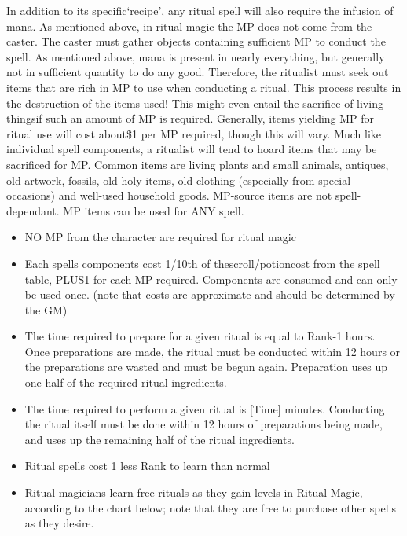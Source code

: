 \documentclass[twoside]{book}
\begin{document}
    {  
    In addition to its specific`recipe', any ritual spell will also require the infusion of mana. As mentioned above, in ritual magic the MP does not come from the caster. The caster must gather objects containing sufficient MP to conduct the spell. As mentioned above, mana is present in nearly everything, but generally not in sufficient quantity to do any good. Therefore, the ritualist must seek out items that are rich in MP to use when conducting a ritual. This process results in the destruction of the items used! This might even entail the sacrifice of living thingsif such an amount of MP is required. Generally, items yielding MP for ritual use will cost about\$1 per MP required, though this will vary. Much like individual spell components, a ritualist will tend to hoard items that may be sacrificed for MP. Common items are living plants and small animals, antiques, old artwork, fossils, old holy items, old clothing (especially from special occasions) and well-used household goods. MP-source items are not spell-dependant. MP items can be used for ANY spell.
    }
  
\begin{itemize}
      
  \item NO MP from the character are required for ritual magic
  \item Each spells components cost 1/10th of thescroll/potioncost from the spell table, PLUS1 for each MP required. Components are consumed and can only be used once. (note that costs are approximate and should be determined by the GM)
  \item The time required to prepare for a given ritual is equal to Rank-1 hours. Once preparations are made, the ritual must be conducted within 12 hours or the preparations are wasted and must be begun again. Preparation uses up one half of the required ritual ingredients.
  \item The time required to perform a given ritual is [Time] minutes. Conducting the ritual itself must be done within 12 hours of preparations being made, and uses up the remaining half of the ritual ingredients.
  \item Ritual spells cost 1 less Rank to learn than normal
  \item Ritual magicians learn free rituals as they gain levels in Ritual Magic, according to the chart below; note that they are free to purchase other spells as they desire.
\end{itemize}
  
\end{document}
